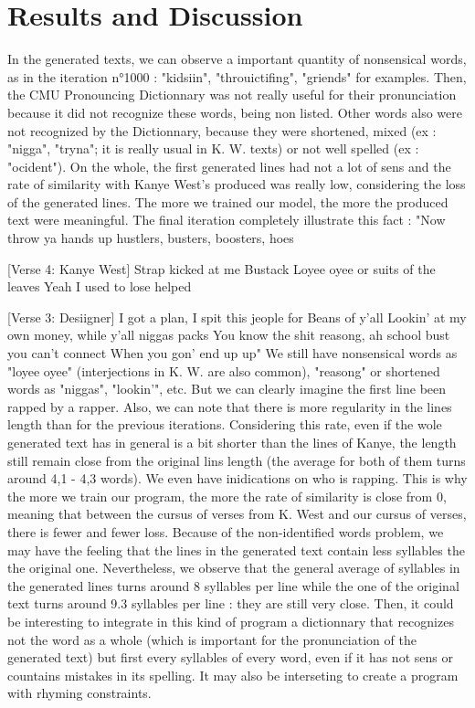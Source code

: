 \documentclass[12pt,a4paper]{article}
\begin{document}
\section{Results and Discussion}

In the generated texts, we can observe a important quantity of nonsensical words, as in the iteration n°1000 : "kidsiin", "throuictifing", "griends" for examples. Then, the CMU Pronouncing Dictionnary was not really useful for their pronunciation because it did not recognize these words, being non listed. Other words also were not recognized by the Dictionnary, because they were shortened, mixed (ex : "nigga", "tryna"; it is really usual in K. W. texts) or not well spelled (ex : "ocident"). On the whole, the first generated lines had not a lot of sens and the rate of similarity with Kanye West's produced was really low, considering the loss of the generated lines. The more we trained our model, the more the produced text were meaningful. The final iteration completely illustrate this fact : "Now throw ya hands up hustlers, busters, boosters, hoes

[Verse 4: Kanye West]
Strap kicked at me Bustack
Loyee oyee or suits of the leaves
Yeah I used to lose helped

[Verse 3: Desiigner]
I got a plan, I spit this jeople for Beans of y'all
Lookin' at my own money, while y'all niggas packs
You know the shit reasong, ah school bust you can't connect
When you gon' end up up"
We still have nonsensical words as "loyee oyee" (interjections in K. W. are also common), "reasong" or shortened words as "niggas", "lookin'", etc. But we can clearly imagine the first line been rapped by a rapper. Also, we can note that there is more regularity in the lines length than for the previous iterations. Considering this rate, even if the wole generated text has in general is a bit shorter than the lines of Kanye, the length still remain close from the original lins length (the average for both of them turns around 4,1 - 4,3 words). We even have inidications on who is rapping. This is why the more we train our program, the more the rate of similarity is close from 0, meaning that between the cursus of verses from K. West and our cursus of verses, there is fewer and fewer loss. Because of the non-identified words problem, we may have the feeling that the lines in the generated text contain less syllables the the original one. Nevertheless, we observe that the general average of syllables in the generated lines turns around 8 syllables per line while the one of the original text turns around 9.3 syllables per line : they are still very close. Then, it could be interesting to integrate in this kind of program a dictionnary that recognizes not the word as a whole (which is important for the pronunciation of the generated text) but first every syllables of every word, even if it has not sens or countains mistakes in its spelling. It may also be interseting to create a program with rhyming constraints.



\end{document}
